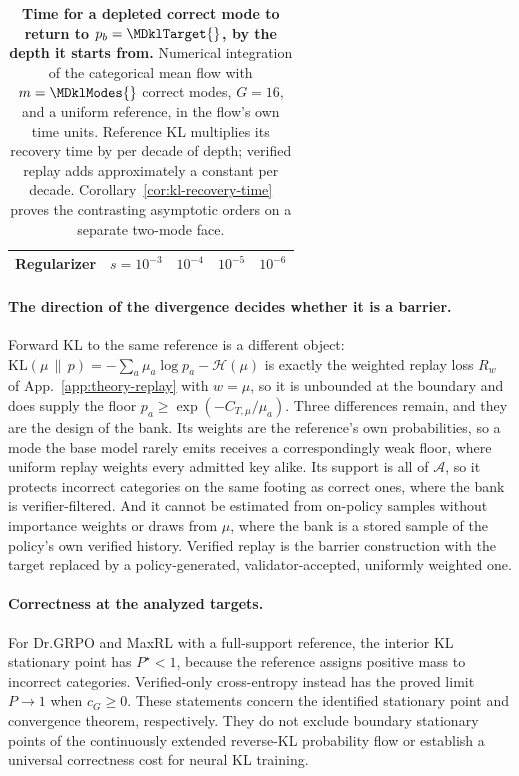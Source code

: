 \documentclass{article}
\newcommand{\1}{\mathbf 1}
\theoremstyle{remark}
\theoremstyle{definition}
\theoremstyle{plain}
\begin{document}
\begin{table}[t]
  \centering
  \caption{\textbf{Time for a depleted correct mode to return to
  $p_b=\MDklTarget{}$, by the depth it starts from.} Numerical integration of
  the categorical mean flow with $m=\MDklModes{}$ correct modes, $G=16$, and a
  uniform reference, in the flow's own time units. Reference KL multiplies its
  recovery time by \MDklDecadeKL{} per decade of depth; verified replay adds
  approximately a constant per decade. Corollary~\ref{cor:kl-recovery-time}
  proves the contrasting asymptotic orders on a separate two-mode face.}
  \label{tab:kl-recovery}
  \small
  \setlength{\tabcolsep}{6pt}
  \begin{tabular}{@{}lrrrr@{}}
    \toprule
    \textbf{Regularizer} & $s=10^{-3}$ & $10^{-4}$ & $10^{-5}$ & $10^{-6}$ \\
    \midrule
    
  \end{tabular}
\end{table}

\paragraph{The direction of the divergence decides whether it is a barrier.}
Forward KL to the same reference is a different object:
$\mathrm{KL}(\mu\,\|\,p)=-\sum_a\mu_a\log p_a-\mathcal H(\mu)$ is exactly the
weighted replay loss $R_w$ of
App.~\ref{app:theory-replay} with $w=\mu$, so it is unbounded at the
boundary and does supply the floor $p_a\ge\exp(-C_{T,\mu}/\mu_a)$. Three
differences remain, and they are the design of the bank. Its weights are the
reference's own probabilities, so a mode the base model rarely emits receives
a correspondingly weak floor, where uniform replay weights every admitted key
alike. Its support is all of $\mathcal A$, so it protects incorrect categories
on the same footing as correct ones, where the bank is verifier-filtered.
And it cannot be estimated from on-policy samples without importance weights or
draws from $\mu$, where the bank is a stored sample of the policy's own
verified history. Verified replay is the barrier construction with the target
replaced by a policy-generated, validator-accepted, uniformly weighted one.

\paragraph{Correctness at the analyzed targets.}
For Dr.GRPO and MaxRL with a full-support reference, the interior KL
stationary point has $P^\star<1$, because the reference assigns positive
mass to incorrect categories. Verified-only cross-entropy instead has the
proved limit $P\to1$ when $c_G\ge0$. These statements concern the identified
stationary point and convergence theorem, respectively. They do not exclude
boundary stationary points of the continuously extended reverse-KL
probability flow or establish a universal correctness cost for neural KL
training.
\end{document}
